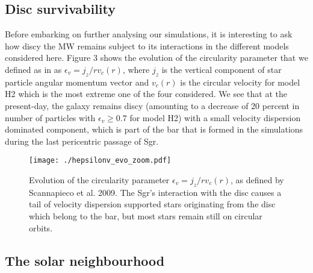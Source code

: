 \documentclass[useAMS,usenatbib]{mnras}
\begin{document}
\subsection{Disc survivability}

Before embarking on further analysing our simulations, it is interesting to ask how discy the MW remains subject to its interactions in the different models considered here. Figure 3 shows the evolution of the circularity parameter that we defined as in \cite{scannapieco09} as $\epsilon_{v}=j_{z}/rv_{c}(r)$, where $j_{z}$ is the vertical component of star particle angular momentum vector and $v_{c}(r)$ is the circular velocity for model H2 which is the most extreme one of the four considered. We see that at the present-day, the galaxy remains discy (amounting to a decrease of 20 percent in number of particles with $\epsilon_{v}\ge0.7$ for model H2) with a small velocity dispersion dominated component, which is part of the bar that is formed in the simulations during the last pericentric passage of Sgr.

\begin{figure}
\texttt{[image: ./hepsilonv\_evo\_zoom.pdf]}
\caption[]{Evolution of the circularity parameter $\epsilon_{v}=j_{z}/rv_{c}(r)$, as defined by Scannapieco et al. 2009. The Sgr's interaction with the disc causes a tail of velocity dispersion supported stars originating from the disc which belong to the bar, but most stars remain still on circular orbits.}
\end{figure}
\subsection{The solar neighbourhood}
\end{document}
